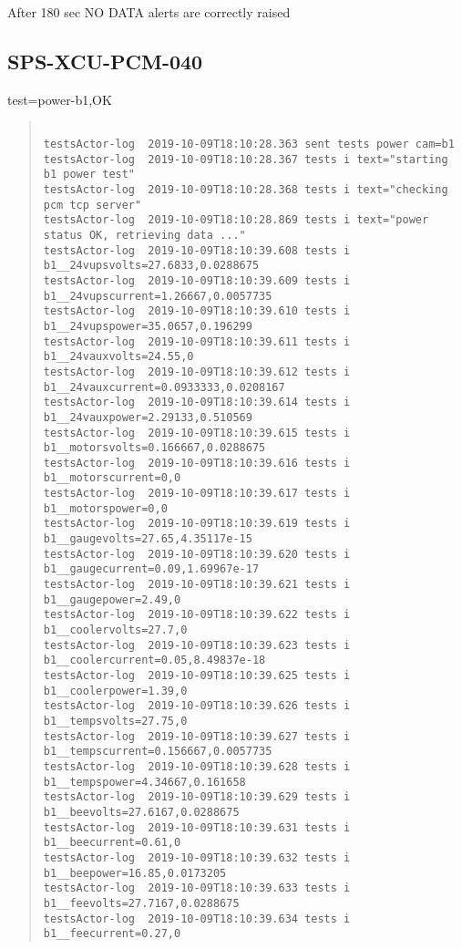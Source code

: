 \noindent After 180 sec NO DATA alerts are correctly raised


\subsection{SPS-XCU-PCM-040}
\label{sec:tc-040}


test=power-b1,OK
\begin{quote}
\begin{tiny}
\begin{verbatim}

testsActor-log  2019-10-09T18:10:28.363 sent tests power cam=b1
testsActor-log  2019-10-09T18:10:28.367 tests i text="starting b1 power test"
testsActor-log  2019-10-09T18:10:28.368 tests i text="checking pcm tcp server"
testsActor-log  2019-10-09T18:10:28.869 tests i text="power status OK, retrieving data ..."
testsActor-log  2019-10-09T18:10:39.608 tests i b1__24vupsvolts=27.6833,0.0288675
testsActor-log  2019-10-09T18:10:39.609 tests i b1__24vupscurrent=1.26667,0.0057735
testsActor-log  2019-10-09T18:10:39.610 tests i b1__24vupspower=35.0657,0.196299
testsActor-log  2019-10-09T18:10:39.611 tests i b1__24vauxvolts=24.55,0
testsActor-log  2019-10-09T18:10:39.612 tests i b1__24vauxcurrent=0.0933333,0.0208167
testsActor-log  2019-10-09T18:10:39.614 tests i b1__24vauxpower=2.29133,0.510569
testsActor-log  2019-10-09T18:10:39.615 tests i b1__motorsvolts=0.166667,0.0288675
testsActor-log  2019-10-09T18:10:39.616 tests i b1__motorscurrent=0,0
testsActor-log  2019-10-09T18:10:39.617 tests i b1__motorspower=0,0
testsActor-log  2019-10-09T18:10:39.619 tests i b1__gaugevolts=27.65,4.35117e-15
testsActor-log  2019-10-09T18:10:39.620 tests i b1__gaugecurrent=0.09,1.69967e-17
testsActor-log  2019-10-09T18:10:39.621 tests i b1__gaugepower=2.49,0
testsActor-log  2019-10-09T18:10:39.622 tests i b1__coolervolts=27.7,0
testsActor-log  2019-10-09T18:10:39.623 tests i b1__coolercurrent=0.05,8.49837e-18
testsActor-log  2019-10-09T18:10:39.625 tests i b1__coolerpower=1.39,0
testsActor-log  2019-10-09T18:10:39.626 tests i b1__tempsvolts=27.75,0
testsActor-log  2019-10-09T18:10:39.627 tests i b1__tempscurrent=0.156667,0.0057735
testsActor-log  2019-10-09T18:10:39.628 tests i b1__tempspower=4.34667,0.161658
testsActor-log  2019-10-09T18:10:39.629 tests i b1__beevolts=27.6167,0.0288675
testsActor-log  2019-10-09T18:10:39.631 tests i b1__beecurrent=0.61,0
testsActor-log  2019-10-09T18:10:39.632 tests i b1__beepower=16.85,0.0173205
testsActor-log  2019-10-09T18:10:39.633 tests i b1__feevolts=27.7167,0.0288675
testsActor-log  2019-10-09T18:10:39.634 tests i b1__feecurrent=0.27,0

\end{verbatim}
\end{tiny}
\end{quote}
